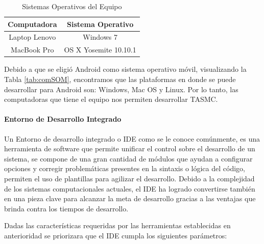 \begin{table} 
	\begin{center}
		\begin{tabular}{|c|c|}
			\hline \rowcolor[RGB]{0,102,204} 
			\textcolor{blanco}{\bf Computadora} &
				\textcolor{blanco}{\bf Sistema Operativo} \\
			\hline \rowcolor[RGB]{224,224,224} 
				Laptop Lenovo &
				Windows 7 \\
      		\hline 
      			MacBook Pro &
				OS X Yosemite 10.10.1 \\
      		\hline 
    		\end{tabular}
	\end{center}
	\caption[Sistemas Operativos del Equipo]{Sistemas Operativos del Equipo} 
	\label{tab:SOE}
\end{table}

Debido a que se eligió Android como sistema operativo móvil, visualizando la Tabla \ref{tab:comSOM}, encontramos que las plataformas en donde se puede desarrollar para Android son: Windows, Mac OS y Linux. Por lo tanto, las computadoras que tiene el equipo nos permiten desarrollar TASMC.

\paragraph{Entorno de Desarrollo Integrado}

Un Entorno de desarrollo integrado o IDE como se le conoce comúnmente, es una herramienta de software que permite unificar el control sobre el desarrollo de un sistema, se compone de una gran cantidad de módulos que ayudan a configurar opciones y corregir problemáticas presentes en la sintaxis o lógica del código, permiten el uso de plantillas para agilizar el desarrollo. Debido a la complejidad de los sistemas computacionales actuales, el IDE ha logrado convertirse también en una pieza clave para alcanzar la meta de desarrollo gracias a las ventajas que brinda contra los tiempos de desarrollo.

Dadas las características requeridas por las herramientas establecidas en anterioridad se priorizara que el IDE cumpla los siguientes parámetros:

